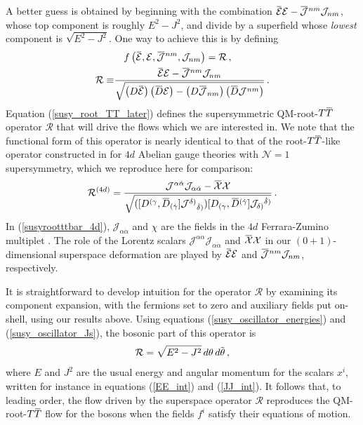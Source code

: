 \documentclass[12pt]{article}
\numberwithin{equation}{section}
\newcommand{\overbar}[1]{\mkern 1.5mu\overline{\mkern-1.5mu#1\mkern-1.5mu}\mkern 1.5mu}
\newcommand{\Dbar}{\overbar{D}}
\newcommand{\thetab}{\overbar{\theta}}
\def\TT{{T\overbar{T}}}
\def\cEb{{\overbar{\mathcal{E}}}}
\def\cE{{\mathcal{E}}}
\begin{document}
A better guess is obtained by beginning with the combination $ \cEb  \cE - \overbar{\mathcal{J}}^{nm} \mathcal{J}_{nm} $, whose top component is roughly $E^2 - J^2$, and divide by a superfield whose \emph{lowest} component is $\sqrt{E^2 - J^2}$. One way to achieve this is by defining
%
\begin{align}\begin{split}\label{susy_root_TT_later}
    &\quad f \left( \cEb , \mathcal{E}, \overbar{\mathcal{J}}^{nm} , \mathcal{J}_{nm}  \right) = \mathcal{R} \, , \\
    \mathcal{R} \equiv &\frac{\cEb  \cE - \overbar{\mathcal{J}}^{nm} \mathcal{J}_{nm}}{ \sqrt{ \left( D \cEb \right) \left( \Dbar \cE \right) - \left( D \overbar{\mathcal{J}}_{nm} \right) \left( \Dbar \mathcal{J}^{nm} \right) } } \, .
\end{split}\end{align}
%
Equation (\ref{susy_root_TT_later}) defines the supersymmetric QM-root-$\TT$ operator $\mathcal{R}$ that will drive the flows which we are interested in. We note that the functional form of this operator is nearly identical to that of the root-$\TT$-like operator constructed in \cite{Ferko:2023ruw} for $4d$ Abelian gauge theories with $\mathcal{N} = 1$ supersymmetry, which we reproduce here for comparison:
%
\begin{equation}
    \mathcal{R}^{(4d)} = \frac{\mathcal{J}^{\alpha\dot\alpha}\mathcal{J}_{\alpha\dot\alpha} - \overbar{\mathcal{X}}\mathcal{X}}{\sqrt{([D^{(\gamma},\overbar{D}_{(\dot{\gamma}}]\mathcal{J}^{\delta)}{}_{\dot{\delta})})    [D_{(\gamma},\overbar{D}^{(\dot{\gamma}}]\mathcal{J}_{\delta)}{}^{\dot{\delta})}}} \, .
    \label{susyrootttbar_4d}
\end{equation}
%
In (\ref{susyrootttbar_4d}), $\mathcal{J}_{\alpha \dot{\alpha}}$ and $\chi$ are the fields in the $4d$ Ferrara-Zumino multiplet \cite{Ferrara:1975}. The role of the Lorentz scalars $\mathcal{J}^{\alpha\dot\alpha} \mathcal{J}_{\alpha\dot\alpha}$ and $\overbar{\mathcal{X}}\mathcal{X}$ in our $(0+1)$-dimensional superspace deformation are played by $\cEb  \cE$ and  $\overbar{\mathcal{J}}^{nm} \mathcal{J}_{nm}$, respectively.

It is straightforward to develop intuition for the operator $\mathcal{R}$ by examining its component expansion, with the fermions set to zero and auxiliary fields put on-shell, using our results above. Using equations (\ref{susy_oscillator_energies}) and (\ref{susy_oscillator_Js}), the bosonic part of this operator is
%
\begin{align}
    \mathcal{R} = \sqrt{ E^2 - J^2 } \, d \theta \, d \thetab \, , 
\end{align}
%
where $E$ and $J^2$ are the usual energy and angular momentum for the scalars $x^i$, written for instance in equations (\ref{EE_int}) and (\ref{JJ_int}). It follows that, to leading order, the flow driven by the superspace operator $\mathcal{R}$ reproduces the QM-root-$\TT$ flow for the bosons when the fields $f^i$ satisfy their equations of motion.
\end{document}
